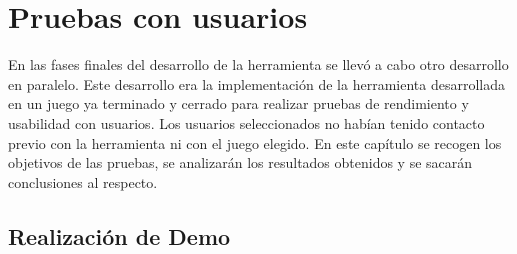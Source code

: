 %
%
%
%
%
%
%
%
%
%

\chapter{Pruebas con usuarios}
\label{cap5}
\label{cap:pruebas}


En las fases finales del desarrollo de la herramienta se llev\'o a cabo otro desarrollo en paralelo. Este desarrollo era la implementaci\'on de la herramienta desarrollada en un juego ya terminado y cerrado para realizar pruebas de rendimiento y usabilidad con usuarios. Los usuarios seleccionados no hab\'ian tenido contacto previo con la herramienta ni con el juego elegido. En este cap\'itulo se recogen los objetivos
de las pruebas, se analizar\'an los resultados obtenidos y se sacar\'an conclusiones al respecto.

\section{Realizaci\'on de Demo}

